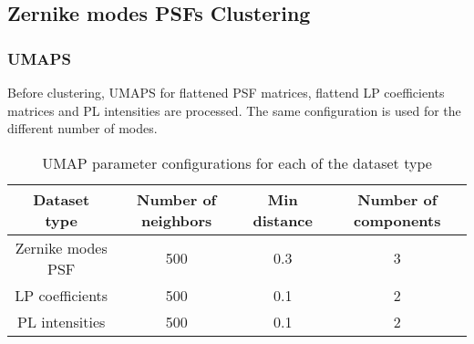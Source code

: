 \subsection{Zernike modes PSFs Clustering}

	\subsubsection{UMAPS}
		
		Before clustering, UMAPS for flattened PSF matrices, flattend LP coefficients matrices and PL intensities are processed. The same configuration is used for the different number of modes.
		
		\begin{table}[h!]
			\centering
			\begin{tabular}{|c|c|c|c|}
				\hline
				\textbf{Dataset type} & \textbf{Number of neighbors} & \textbf{Min distance} & \textbf{Number of components} \\
				\hline
				Zernike modes PSF & 500 & 0.3 & 3 \\
				\hline
				LP coefficients & 500 & 0.1 & 2 \\
				\hline
				PL intensities & 500 & 0.1 & 2 \\
				
				\hline
			\end{tabular}
		\caption{UMAP parameter configurations for each of the dataset type}
		\end{table}
		
